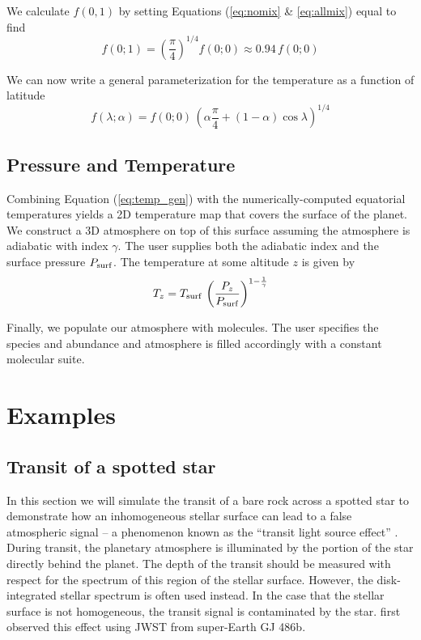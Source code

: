 \documentclass[twocolumn]{aastex631}
\begin{document}
We calculate $f(0,1)$ by setting Equations (\ref{eq:nomix} \& \ref{eq:allmix}) equal to find
\begin{equation}
    f(0;1) = \left(\frac{\pi}{4}\right)^{1/4} f(0;0) \approx 0.94 \,f(0;0)
\end{equation}

We can now write a general parameterization for the temperature as a function of latitude
\begin{equation}
    \label{eq:temp_gen}
    f(\lambda;\alpha) = f(0;0)\,\left(\alpha \frac{\pi}{4} + (1-\alpha) \cos{\lambda}\right)^{1/4}
\end{equation}

\subsection{Pressure and Temperature}
Combining Equation (\ref{eq:temp_gen}) with the numerically-computed equatorial temperatures yields a 2D temperature map that covers the surface of the planet. We construct a 3D atmosphere on top of this surface assuming the atmosphere is adiabatic with index $\gamma$. The user supplies both the adiabatic index and the surface pressure $P_{\rm surf}$. The temperature at some altitude $z$ is given by
\begin{equation}
    T_z = T_{\rm surf}\,\left( \frac{P_z}{P_{\rm surf}} \right)^{1-\frac{1}{\gamma}}
\end{equation}

Finally, we populate our atmosphere with molecules. The user specifies the species and abundance and atmosphere is filled accordingly with a constant molecular suite.

\section{Examples \label{sec:examples}}

\subsection{Transit of a spotted star}

In this section we will simulate the transit of a bare rock across a spotted star to demonstrate how an inhomogeneous
stellar surface can lead to a false atmospheric signal -- a phenomenon known as the ``transit light source effect'' \citep{rackham2018}.
During transit, the planetary atmosphere is illuminated by the portion of the star directly behind the planet. The depth of the transit
should be measured with respect for the spectrum of this region of the stellar surface. However, the disk-integrated stellar spectrum is often used instead.
In the case that the stellar surface is not homogeneous, the transit signal is contaminated by the star.
\citet{moran2023} first observed this effect using JWST from super-Earth GJ 486b.
\end{document}
